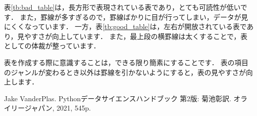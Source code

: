 \documentclass{jarticle}
\begin{document}
表\ref{tb:bad_table}は，長方形で表現されている表であり，とても可読性が低いです．
また，罫線が多すぎるので，罫線ばかりに目が行ってしまい，データが見にくくなっています．
一方，表\ref{tb:good_table}は，左右が開放されている表であり，見やすさが向上しています．
また，最上段の横罫線は太くすることで，表としての体裁が整っています．

表を作成する際に意識することは，できる限り簡素にすることです．
表の項目のジャンルが変わるとき以外は罫線を引かないようにすると，表の見やすさが向上します．

\begin{thebibliography}{99}
   Jake VanderPlas. Pythonデータサイエンスハンドブック 第2版: 菊池彰訳. オライリージャパン, 2021, 545p. \\\\
\end{thebibliography}
\end{document}
